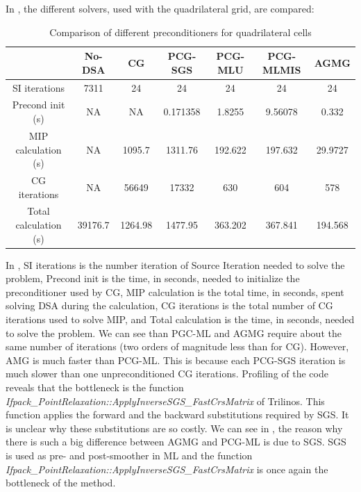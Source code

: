 In , the different solvers, used with the
quadrilateral grid, are compared:
\begin{table}[H]
  \begin{center}
    \caption{Comparison of different preconditioners for quadrilateral cells}
    \begin{tabular}{|c|c|c|c|c|c|c|}
      \hline
      & No-DSA & CG & PCG-SGS & PCG-MLU & PCG-MLMIS & AGMG \\
      \hline
      SI iterations   & 7311    & 24      & 24       & 24      & 24      & 24 \\
   Precond init (s)   & NA      & NA      & 0.171358 & 1.8255  & 9.56078 & 0.332 \\
MIP calculation (s)   & NA      & 1095.7  & 1311.76  & 192.622 & 197.632 & 29.9727 \\
      CG iterations   & NA      & 56649   & 17332    & 630     & 604     & 578 \\
Total calculation (s) & 39176.7 & 1264.98 & 1477.95  & 363.202 & 367.841 &
      194.568 \\
      \hline
    \end{tabular}
    \label{comparison_homog_quad}
  \end{center}
\end{table}
In , SI iterations is the number iteration of 
Source Iteration needed to solve the problem, Precond init is the time, in
seconds, needed to initialize the preconditioner used by CG, MIP calculation
is the total time, in seconds, spent solving DSA during the calculation, CG
iterations is the total number of CG iterations used to solve MIP, and Total
calculation is the time, in seconds, needed to solve the problem. We can see
than PGC-ML and AGMG require about the same number of iterations (two orders
of magnitude less than for CG). However, AMG is much faster than PCG-ML. This 
is because each PCG-SGS iteration is much slower than one
unpreconditioned CG iterations. Profiling of the code reveals that the
bottleneck is the function 
\emph{Ifpack\_PointRelaxation::ApplyInverseSGS\_FastCrsMatrix} of Trilinos. This
function applies the forward and the backward substitutions required by SGS.
It is unclear why these substitutions are so costly. We can see in
, the reason why there is such a big
difference between AGMG and PCG-ML is due to SGS. SGS is used as pre- and
post-smoother in ML and the function
\emph{Ifpack\_PointRelaxation::ApplyInverseSGS\_FastCrsMatrix} is once again the
bottleneck of the method.

